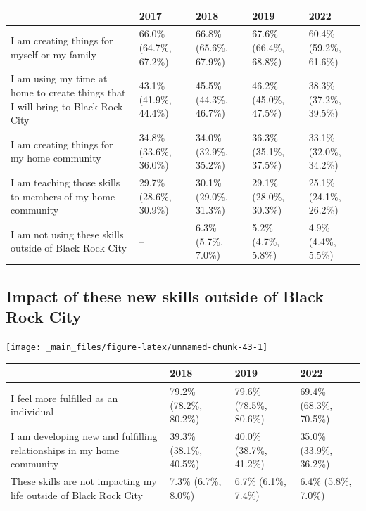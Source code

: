 \documentclass[
]{book}
\begin{document}
\begin{table}
\centering
\begin{tabular}[t]{>{}l|>{}l|>{}l|>{}l|>{}l}
\hline
  & 2017 & 2018 & 2019 & 2022\\
\hline
I am creating things for 
 myself or my family & 66.0\% (64.7\%, 67.2\%) & 66.8\% (65.6\%, 67.9\%) & 67.6\% (66.4\%, 68.8\%) & 60.4\% (59.2\%, 61.6\%)\\
\hline
I am using my time at home to create things that 
 I will bring to Black Rock City & 43.1\% (41.9\%, 44.4\%) & 45.5\% (44.3\%, 46.7\%) & 46.2\% (45.0\%, 47.5\%) & 38.3\% (37.2\%, 39.5\%)\\
\hline
I am creating things for 
 my home community & 34.8\% (33.6\%, 36.0\%) & 34.0\% (32.9\%, 35.2\%) & 36.3\% (35.1\%, 37.5\%) & 33.1\% (32.0\%, 34.2\%)\\
\hline
I am teaching those skills to 
 members of my home community & 29.7\% (28.6\%, 30.9\%) & 30.1\% (29.0\%, 31.3\%) & 29.1\% (28.0\%, 30.3\%) & 25.1\% (24.1\%, 26.2\%)\\
\hline
I am not using these skills 
 outside of Black Rock City & -- & 6.3\% (5.7\%, 7.0\%) & 5.2\% (4.7\%, 5.8\%) & 4.9\% (4.4\%, 5.5\%)\\
\hline
\end{tabular}
\end{table}

\hypertarget{impact-of-these-new-skills-outside-of-black-rock-city}{%
\subsection{Impact of these new skills outside of Black Rock City}\label{impact-of-these-new-skills-outside-of-black-rock-city}}

\texttt{[image: \_main\_files/figure-latex/unnamed-chunk-43-1]}

\begin{table}
\centering
\begin{tabular}[t]{>{}l|>{}l|>{}l|>{}l}
\hline
  & 2018 & 2019 & 2022\\
\hline
I feel more fulfilled as 
 an individual & 79.2\% (78.2\%, 80.2\%) & 79.6\% (78.5\%, 80.6\%) & 69.4\% (68.3\%, 70.5\%)\\
\hline
I am developing new and 
 fulfilling relationships 
 in my home community & 39.3\% (38.1\%, 40.5\%) & 40.0\% (38.7\%, 41.2\%) & 35.0\% (33.9\%, 36.2\%)\\
\hline
These skills are not 
 impacting my life outside of 
 Black Rock City & 7.3\% (6.7\%, 8.0\%) & 6.7\% (6.1\%, 7.4\%) & 6.4\% (5.8\%, 7.0\%)\\
\hline
\end{tabular}
\end{table}
\end{document}
